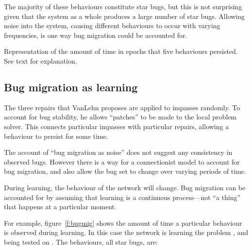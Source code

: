 The majority of these behaviours constitute star bugs, but this is not
surprising given that the system as a whole produces a large number of star
bugs.  Allowing noise into the system, causing different behaviours to
occur with varying frequencies, is one way bug migration could be accounted
for.

\begin{fancyfigure}
\centerline{}
\caption{Representation of the amount of time in epochs that five
behaviours persisted. See text for explanation.}\label{f:bugmig}
\end{fancyfigure}


\subsection{Bug migration as learning}

The three repairs that VanLehn proposes are applied to impasses randomly.
To account for bug stability, he allows ``patches'' to be made to the local
problem solver.  This connects particular impasses with particular repairs,
allowing a behaviour to persist for some time.

The account of ``bug migration as noise'' does not suggest any consistency
in observed bugs.  However there is a way for a connectionist model to
account for bug migration, and also allow the bug set to change over
varying periods of time.

During learning, the behaviour of the network will change.  Bug migration
can be accounted for by
assuming that learning is a continuous process---not ``a thing''
that happens at a particular moment.

For example, figure~\ref{f:bugmig} shows the amount of time a particular
behaviour is observed during learning.  In this case the network is
learning the problem , and being tested on . The
behaviours, all star bugs, are:

